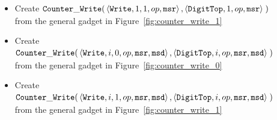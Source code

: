 \begin{itemize}
\begin{itemize}
        \item Create
        $\begin{aligned}[t]
            {\tt Counter\_Write}(& \left\langle {\tt Write},    1, 1, op, {\tt msr} \right\rangle,
                       \left\langle {\tt DigitTop}, 1,    op, {\tt msr} \right\rangle \;)
        \end{aligned}$ \\ from the general gadget in Figure~\ref{fig:counter_write_1}

        \item Create
        $\begin{aligned}[t]
            {\tt Counter\_Write}(& \left\langle {\tt Write},    i, 0, op, {\tt msr}, {\tt msd}\right\rangle,
                       \left\langle {\tt DigitTop}, i,    op, {\tt msr}, {\tt msd}\right\rangle \;)
        \end{aligned}$ \\ from the general gadget in Figure~\ref{fig:counter_write_0}

        \item Create
        $\begin{aligned}[t]
            {\tt Counter\_Write}(& \left\langle {\tt Write},    i, 1, op, {\tt msr}, {\tt msd}\right\rangle,
                       \left\langle {\tt DigitTop}, i,    op, {\tt msr}, {\tt msd}\right\rangle \;)
        \end{aligned}$ \\ from the general gadget in Figure~\ref{fig:counter_write_1}
    \end{itemize}

\end{itemize}

\vspace{.5cm}

